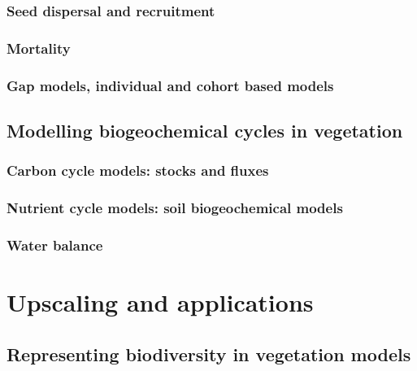 \documentclass[oneside]{book}
\begin{document}

\section{Seed dispersal and
recruitment}\label{seed-dispersal-and-recruitment}

\section{Mortality}\label{mortality}

\section{Gap models, individual and cohort based
models}\label{gap-models-individual-and-cohort-based-models}

\chapter{Modelling biogeochemical cycles in
vegetation}\label{modelling-biogeochemical-cycles-in-vegetation}


\section{Carbon cycle models: stocks and
fluxes}\label{carbon-cycle-models-stocks-and-fluxes}

\section{Nutrient cycle models: soil biogeochemical
models}\label{nutrient-cycle-models-soil-biogeochemical-models}

\section{Water balance}\label{water-balance}

\part{Upscaling and
applications}\label{part-upscaling-and-applications}

\chapter{Representing biodiversity in vegetation
models}\label{representing-biodiversity-in-vegetation-models}
\end{document}
